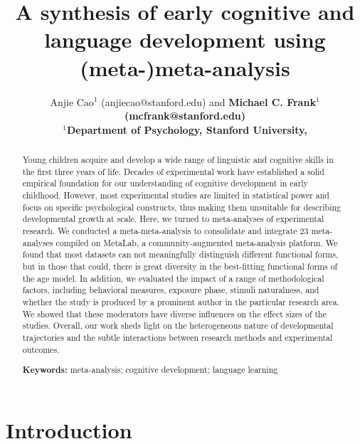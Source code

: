 \documentclass[10pt, letterpaper]{article}
\title{A synthesis of early cognitive and language development using
(meta-)meta-analysis}
\author{Anjie Cao$^1$  (anjiecao@stanford.edu)
 and \bf{Michael C. Frank$^1$ (mcfrank@stanford.edu)} \\
$^1$Department of Psychology, Stanford University, }
\begin{document}
\maketitle

\begin{abstract}
Young children acquire and develop a wide range of linguistic and
cognitive skills in the first three years of life. Decades of
experimental work have established a solid empirical foundation for our
understanding of cognitive development in early childhood. However, most
experimental studies are limited in statistical power and focus on
specific psychological constructs, thus making them unsuitable for
describing developmental growth at scale. Here, we turned to
meta-analyses of experimental research. We conducted a
meta-meta-analysis to consolidate and integrate 23 meta-analyses
compiled on MetaLab, a community-augmented meta-analysis platform. We
found that most datasets can not meaningfully distinguish different
functional forms, but in those that could, there is great diversity in
the best-fitting functional forms of the age model. In addition, we
evaluated the impact of a range of methodological factors, including
behavioral measures, exposure phase, stimuli naturalness, and whether
the study is produced by a prominent author in the particular research
area. We showed that these moderators have diverse influences on the
effect sizes of the studies. Overall, our work sheds light on the
heterogeneous nature of developmental trajectories and the subtle
interactions between research methods and experimental outcomes.

\textbf{Keywords:}
meta-analysis; cognitive development; language learning
\end{abstract}

\hypertarget{introduction}{%
\section{Introduction}\label{introduction}}
\end{document}
